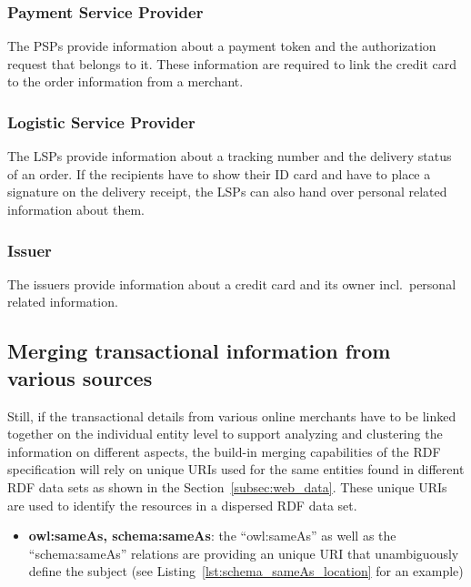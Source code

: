 
\subsubsection{Payment Service Provider}
\label{subsub:prep_info_psp}

The \gls{PSP}s provide information about a payment token and the authorization request that belongs to it. These information are required to link the credit card to the order information from a merchant.

\subsubsection{Logistic Service Provider}
\label{subsub:prep_info_lsp}

The \gls{LSP}s provide information about a tracking number and the delivery status of an order. If the recipients have to show their ID card and have to place a signature on the delivery receipt, the \gls{LSP}s can also hand over personal related information about them.

\subsubsection{Issuer}
\label{subsub:prep_info_issuer}

The issuers provide information about a credit card and its owner incl.\ personal related information.

\subsection{Merging transactional information from various sources}
\label{subsec:information_mapping}

Still, if the transactional details from various online merchants have to be linked together on the individual entity level to support analyzing and clustering the information on different aspects, the build-in merging capabilities of the \gls{RDF} specification will rely on unique \gls{URI}s used for the same entities found in different \gls{RDF} data sets as shown in the Section~\ref{subsec:web_data}. These unique \gls{URI}s are used to identify the resources in a dispersed \gls{RDF} data set. \@

\begin{itemize}
	\item \textbf{owl:sameAs, schema:sameAs}: the ``owl:sameAs'' as well as the ``schema:sameAs'' relations are providing an unique \gls{URI} that unambiguously define the subject (see Listing~\ref{lst:schema_sameAs_location} for an example)
\end{itemize}

